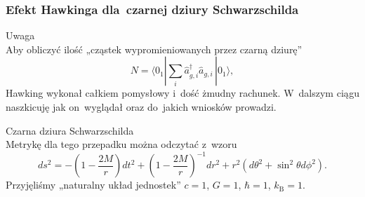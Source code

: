 \documentclass[10pt,t]{beamer}
\begin{document}
\begin{frame}
  \frametitle{Efekt Hawkinga dla~czarnej dziury Schwarzschilda}


  Uwaga \\
  Aby obliczyć ilość „cząstek wypromieniowanych przez czarną dziurę”
  \begin{equation}
    \label{eq:Promieniowanie-Hawkigna-13}
    N =
    \langle 0_{ 1 } | \sum_{ i } \widehat{ a }_{ g, i }^{ \dagger }
    \widehat{ a }_{ g, i }\, | 0_{ 1 } \rangle,
  \end{equation}
  Hawking wykonał całkiem pomysłowy i~dość żmudny rachunek.
  W~dalszym ciągu naszkicuję jak on~wyglądał oraz do~jakich wniosków
  prowadzi.

  Czarna dziura Schwarzschilda \\
  Metrykę dla tego przepadku można odczytać z~wzoru
  \begin{equation}
    \label{eq:Promieniowanie-Hawkinga-14}
    ds^{ 2 } =
    -\left(1 - \frac{ 2M }{ r } \right) dt^{ 2 }
    + \left(1 - \frac{ 2M }{ r } \right)^{ -1 } dr^{ 2 }
    + r^{ 2 } ( d \theta^{ 2 } + \sin^{ 2 }\theta d\phi^{ 2 } ).
  \end{equation}
  Przyjęliśmy „naturalny układ jednostek” $c = 1$, $G = 1$, $\hbar = 1$,
  $k_{ \mathrm{B} } = 1$.

\end{frame}
\end{document}
